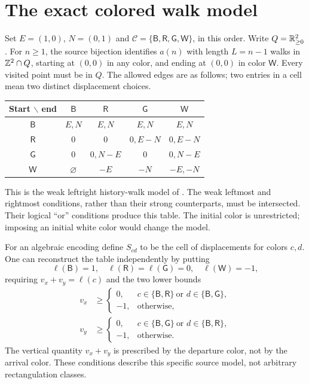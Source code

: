 \documentclass[11pt,letterpaper]{article}
\newcommand{\B}{\mathsf B}\newcommand{\RR}{\mathsf R}\newcommand{\GG}{\mathsf G}\newcommand{\W}{\mathsf W}
\numberwithin{equation}{section}
\begin{document}
\section{The exact colored walk model}\label{osr:sec:model}
Set $E=(1,0)$, $N=(0,1)$ and $\mathcal C=\{\B,\RR,\GG,\W\}$, in this order. Write $Q=\mathbb R_{\ge0}^2$. For $n\ge1$, the source bijection identifies $a(n)$ with length $L=n-1$ walks in $\mathbb Z^2\cap Q$, starting at $(0,0)$ in any color, and ending at $(0,0)$ in color $\W$. Every visited point must be in $Q$. The allowed edges are as follows; two entries in a cell mean two distinct displacement choices.
\begin{center}
\begin{tabular}{c@{\quad}cccc}
\toprule
Start $\backslash$ end & $\B$ & $\RR$ & $\GG$ & $\W$\\
\midrule
$\B$ & $E,N$ & $E,N$ & $E,N$ & $E,N$\\
$\RR$ & $0$ & $0$ & $0,E-N$ & $0,E-N$\\
$\GG$ & $0$ & $0,N-E$ & $0$ & $0,N-E$\\
$\W$ & $\varnothing$ & $-E$ & $-N$ & $-E,-N$\\
\bottomrule
\end{tabular}
\end{center}
This is the weak leftright history-walk model of \cite[Section 4.6, Figure 4.16]{rect}. The weak leftmost and rightmost conditions, rather than their strong counterparts, must be intersected. Their logical ``or'' conditions produce this table. The initial color is unrestricted; imposing an initial white color would change the model.

For an algebraic encoding define $S_{cd}$ to be the cell of displacements for colors $c,d$. One can reconstruct the table independently by putting
\[
 \ell(\B)=1,\quad \ell(\RR)=\ell(\GG)=0,\quad \ell(\W)=-1,
\]
requiring $v_x+v_y=\ell(c)$ and the two lower bounds
\begin{align*}
 v_x&\ge\begin{cases}0,&c\in\{\B,\RR\}\ \text{or }d\in\{\B,\GG\},\\-1,&\text{otherwise},\end{cases}\\
 v_y&\ge\begin{cases}0,&c\in\{\B,\GG\}\ \text{or }d\in\{\B,\RR\},\\-1,&\text{otherwise}.
 \end{cases}
\end{align*}
The vertical quantity $v_x+v_y$ is prescribed by the departure color, not by the arrival color. These conditions describe this specific source model, not arbitrary rectangulation classes.
\end{document}
